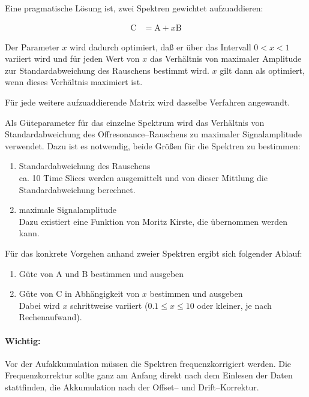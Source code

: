 \documentclass{article}
\newcommand{\vect}[1]{\boldsymbol{\mathrm #1}}
\begin{document}
Eine pragmatische Lösung ist, zwei Spektren gewichtet aufzuaddieren:

\begin{align*}
	\vect{C} &= \vect{A} + x \vect{B}
\end{align*}

Der Parameter $x$ wird dadurch optimiert, daß er über das Intervall $0 < x < 1$ 
variiert wird und für jeden Wert von $x$ das Verhältnis von maximaler Amplitude 
zur Standardabweichung des Rauschens bestimmt wird. $x$ gilt dann als 
optimiert, wenn dieses Verhältnis maximiert ist.

Für jede weitere aufzuaddierende Matrix wird dasselbe Verfahren angewandt.

Als Güteparameter für das einzelne Spektrum wird das Verhältnis von
Standardabweichung des Offresonance--Rauschens zu maximaler Signalamplitude
verwendet. Dazu ist es notwendig, beide Größen für die Spektren zu bestimmen:

\begin{enumerate}
  \item Standardabweichung des Rauschens\\
  ca. 10 Time Slices werden ausgemittelt und von dieser Mittlung die
  Standardabweichung berechnet.
  \item maximale Signalamplitude\\
  Dazu existiert eine Funktion von Moritz Kirste, die übernommen werden kann.
\end{enumerate}

Für das konkrete Vorgehen anhand zweier Spektren ergibt sich folgender Ablauf:

\begin{enumerate}
  \item Güte von $\vect{A}$ und $\vect{B}$ bestimmen und ausgeben
  \item Güte von $\vect{C}$ in Abhängigkeit von $x$ bestimmen und ausgeben\\
  Dabei wird $x$ schrittweise variiert ($0.1\leq x\leq 10$ oder kleiner, je nach
  Rechenaufwand).
\end{enumerate}

\paragraph{Wichtig:} Vor der Aufakkumulation müssen die Spektren 
frequenzkorrigiert werden. Die Frequenzkorrektur sollte ganz am Anfang direkt 
nach dem Einlesen der Daten stattfinden, die Akkumulation nach der Offset-- und 
Drift--Korrektur.
\end{document}
